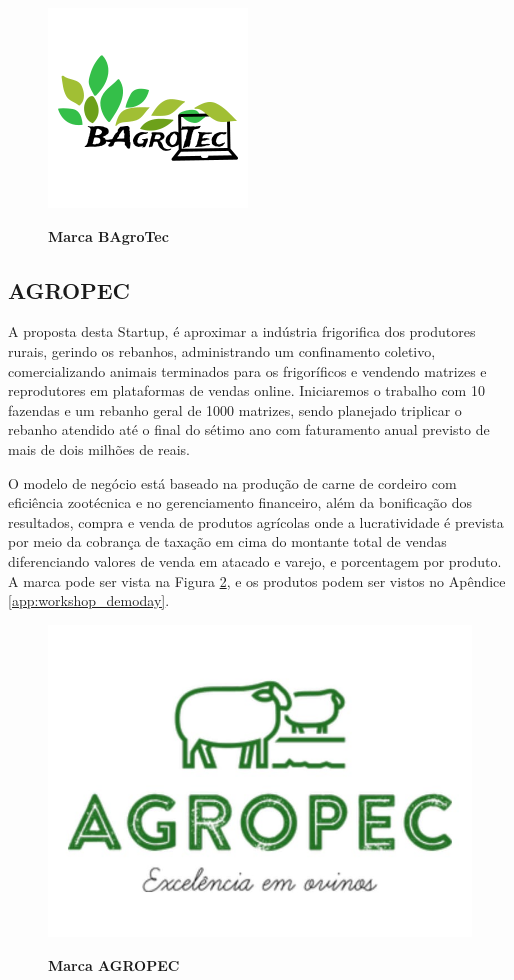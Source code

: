 \begin{figure}[H]
\centering
\caption{\textbf{Marca BAgroTec}}
\includegraphics[scale=1.5]{Imagens/bagrotec.png}
\label{figura_15}
\end{figure}


\subsection{AGROPEC}


A proposta desta Startup, é aproximar a indústria frigorifica dos produtores rurais, gerindo os rebanhos, administrando um confinamento coletivo, comercializando animais terminados para os frigoríficos e vendendo matrizes e reprodutores em plataformas de vendas online. Iniciaremos o trabalho com 10 fazendas e um rebanho geral de 1000 matrizes, sendo planejado triplicar o rebanho atendido até o final do sétimo ano com faturamento anual previsto de mais de dois milhões de reais.

O modelo de negócio está baseado na produção de carne de cordeiro com eficiência zootécnica e no gerenciamento financeiro, além da bonificação dos resultados, compra e venda de produtos agrícolas onde a lucratividade é prevista por meio da cobrança de taxação em cima do montante total de vendas diferenciando valores de venda em atacado e varejo, e porcentagem por produto. A marca pode ser vista na Figura \ref{figura_18}, e os produtos podem ser vistos no Apêndice \ref{app:workshop_demoday}.


\begin{figure}[H]
\centering
\caption{\textbf{Marca AGROPEC}}
\includegraphics[scale=0.3]{Imagens/agropec.jpg}
\label{figura_18}
\end{figure}

